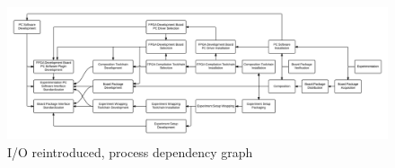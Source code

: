 \documentclass[main.tex]{subfiles}
\begin{document}
\begin{landscape}
\begin{figure}
\centering
\includegraphics[width=\hsize]{img/processes-dependencies-io}
\caption{I/O reintroduced, process dependency graph}
\label{fig:dependencies-io}
\end{figure}
\end{landscape}
\end{document}
